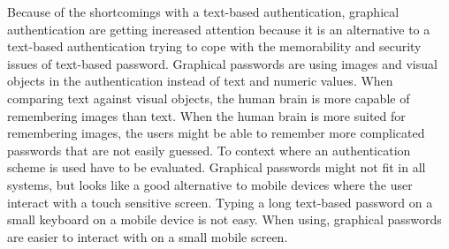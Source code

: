   Because of the shortcomings with a text-based authentication, graphical authentication are getting increased attention because it is an alternative to a text-based authentication trying to cope with the memorability and security issues of text-based password. Graphical passwords are using images and visual objects in the authentication instead of text and numeric values. When comparing text against visual objects, the human brain is more capable of remembering images than text. When the human brain is more suited for remembering images, the users might be able to remember more complicated passwords that are not easily guessed. To context where an authentication scheme is used have to be evaluated. Graphical passwords might not fit in all systems, but looks like a good alternative to mobile devices where the user interact with a touch sensitive screen. Typing a long text-based password on a small keyboard on a mobile device is not easy. When using, graphical passwords are easier to interact with on a small mobile screen.